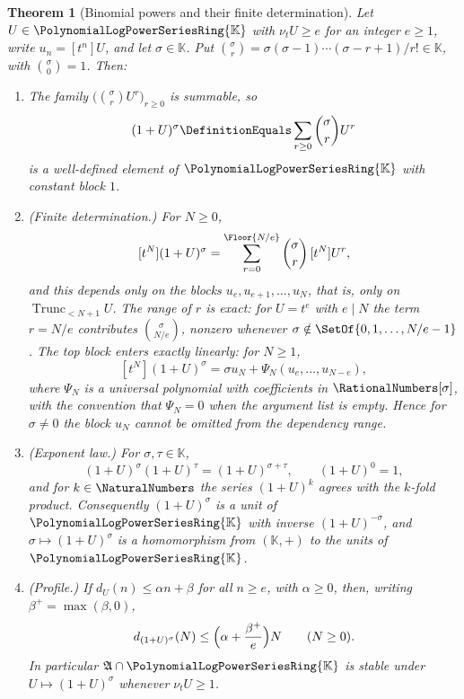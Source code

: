 \documentclass[11pt,oneside]{article}
\theoremstyle{plain}
\newtheorem{theorem}{Theorem}[section]
\theoremstyle{definition}
\theoremstyle{remark}
\newcommand{\K}{\mathbb{K}}
\newcommand{\PLpow}{\PolynomialLogPowerSeriesRing{\K}}   %
\newcommand{\ordt}{\nu_{t}}                              %
\newcommand{\Trunc}[2]{\operatorname{Trunc}_{<#2}#1}     %
\newcommand{\dprofile}[1]{d_{#1}}                        %
\begin{document}
\begin{theorem}[Binomial powers and their finite determination]
\label{plt:thm:mul-binomial}
Let $U\in\PLpow$ with $\ordt U\ge e$ for an integer $e\ge1$, write
$u_n=[t^n]U$, and let $\sigma\in\K$.  Put
$\binom{\sigma}{r}=\sigma(\sigma-1)\cdots(\sigma-r+1)/r!\in\K$, with
$\binom{\sigma}{0}=1$.  Then:
\begin{enumerate}
\item The family $\bigl(\binom{\sigma}{r}U^r\bigr)_{r\ge0}$ is summable, so
\begin{equation}\label{plt:eq:mul-binomial-def}
 (1+U)^\sigma\DefinitionEquals\sum_{r\ge0}\binom{\sigma}{r}U^r
\end{equation}
is a well-defined element of $\PLpow$ with constant block $1$.
\item \emph{(Finite determination.)}  For $N\ge0$,
\begin{equation}\label{plt:eq:mul-binomial-finite}
 [t^N](1+U)^\sigma
 =\sum_{r=0}^{\Floor{N/e}}\binom{\sigma}{r}\,[t^N]U^r,
\end{equation}
and this depends only on the blocks $u_e,u_{e+1},\ldots,u_N$, that is, only
on $\Trunc{U}{N+1}$.  The range of $r$ is exact: for $U=t^e$ with $e\mid N$
the term $r=N/e$ contributes $\binom{\sigma}{N/e}$, nonzero whenever
$\sigma\notin\SetOf{0,1,\ldots,N/e-1}$.  The top block enters exactly
linearly: for $N\ge1$,
\begin{equation}\label{plt:eq:mul-binomial-top}
 [t^N](1+U)^\sigma=\sigma u_N+\Psi_N(u_e,\ldots,u_{N-e}),
\end{equation}
where $\Psi_N$ is a universal polynomial with coefficients in
$\RationalNumbers[\sigma]$, with the convention that $\Psi_N=0$ when the
argument list is empty.  Hence for $\sigma\ne0$ the block $u_N$ cannot be
omitted from the dependency range.
\item \emph{(Exponent law.)}  For $\sigma,\tau\in\K$,
\begin{equation}\label{plt:eq:mul-binomial-group}
 (1+U)^\sigma(1+U)^\tau=(1+U)^{\sigma+\tau},
 \qquad (1+U)^0=1,
\end{equation}
and for $k\in\NaturalNumbers$ the series $(1+U)^k$ agrees with the $k$-fold
product.  Consequently $(1+U)^\sigma$ is a unit of $\PLpow$ with inverse
$(1+U)^{-\sigma}$, and $\sigma\mapsto(1+U)^\sigma$ is a homomorphism from
$(\K,+)$ to the units of $\PLpow$.
\item \emph{(Profile.)}  If $\dprofile{U}(n)\le\alpha n+\beta$ for all
$n\ge e$, with $\alpha\ge0$, then, writing $\beta^+=\max(\beta,0)$,
\begin{equation}\label{plt:eq:mul-binomial-profile}
 \dprofile{(1+U)^\sigma}(N)\le\Bigl(\alpha+\frac{\beta^+}{e}\Bigr)N
 \qquad(N\ge0).
\end{equation}
In particular $\mathfrak A\cap\PLpow$ is stable under
$U\mapsto(1+U)^\sigma$ whenever $\ordt U\ge1$.
\end{enumerate}
\end{theorem}
\end{document}
